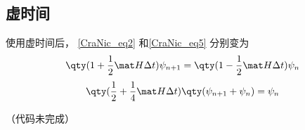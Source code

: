 \subsection{虚时间}
使用虚时间后， \autoref{CraNic_eq2} 和\autoref{CraNic_eq5} 分别变为
\begin{equation}
\qty(1+\frac12\mat H\Delta t)\psi_{n+1} = \qty(1-\frac12\mat H\Delta t)\psi_n
\end{equation}
\begin{equation}
\qty(\frac12 + \frac14\mat H\Delta t)\qty(\psi_{n+1}+\psi_n) = \psi_n
\end{equation}

（代码未完成）
